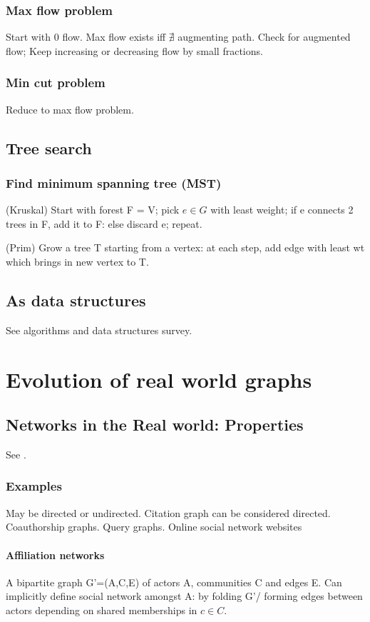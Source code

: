 \documentclass[oneside, article]{memoir}
\begin{document}
\section{Max flow problem}
Start with 0 flow. Max flow exists iff $ \nexists $ augmenting path. Check for augmented flow; Keep increasing or decreasing flow by small fractions.

\section{Min cut problem}
Reduce to max flow problem.

\chapter{Tree search}
\section{Find minimum spanning tree (MST)}
(Kruskal) Start with forest F = V; pick $e \in G$ with least weight; if e connects 2 trees in F, add it to F: else discard e; repeat.

(Prim) Grow a tree T starting from a vertex: at each step, add edge with least wt which brings in new vertex to T.

\chapter{As data structures}
See algorithms and data structures survey.

\part{Evolution of real world graphs}
\chapter{Networks in the Real world: Properties}
See \cite{leskovecThesis}.

\section{Examples}
May be directed or undirected. Citation graph can be considered directed. Coauthorship graphs. Query graphs. Online social network websites

\subsection{Affiliation networks}
A bipartite graph G'=(A,C,E) of actors A, communities C and edges E. Can implicitly define social network amongst A: by folding G'/ forming edges between actors depending on shared memberships in $c \in C$.
\end{document}

